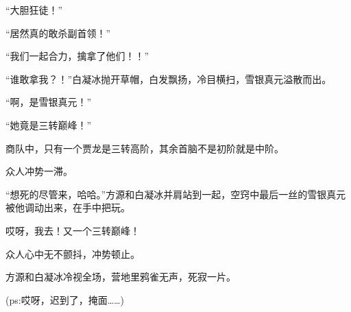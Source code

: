 \begin{this_body}
“大胆狂徒！”

“居然真的敢杀副首领！”

“我们一起合力，擒拿了他们！！”

“谁敢拿我？！”白凝冰抛开草帽，白发飘扬，冷目横扫，雪银真元溢散而出。

“啊，是雪银真元！”

“她竟是三转巅峰！”

商队中，只有一个贾龙是三转高阶，其余首脑不是初阶就是中阶。

众人冲势一滞。

“想死的尽管来，哈哈。”方源和白凝冰并肩站到一起，空窍中最后一丝的雪银真元被他调动出来，在手中把玩。

哎呀，我去！又一个三转巅峰！

众人心中无不颤抖，冲势顿止。

方源和白凝冰冷视全场，营地里鸦雀无声，死寂一片。

(ps:哎呀，迟到了，掩面……)

\end{this_body}

